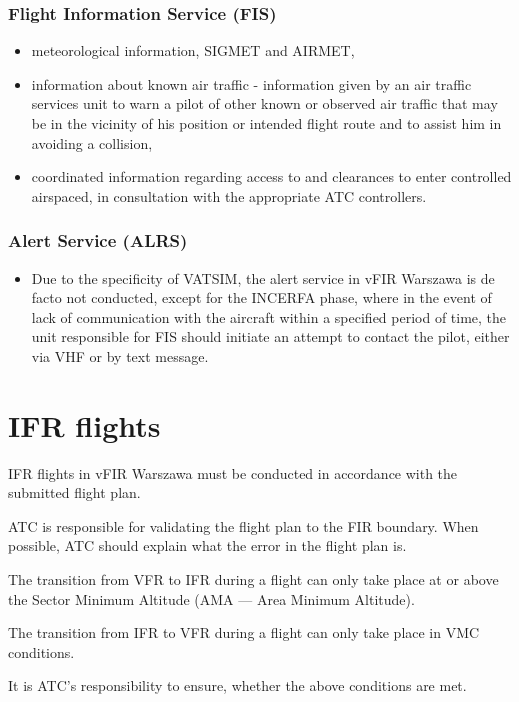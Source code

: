 \subsubsection{Flight Information Service (FIS)}
\begin{itemize}
    \item meteorological information, SIGMET and AIRMET,
    \item information about known air traffic - information given by an air traffic services unit to warn a pilot of other known or observed air traffic that may be in the vicinity of his position or intended flight route and to assist him in avoiding a collision,
    \item coordinated information regarding access to and clearances to enter controlled airspaced, in consultation with the appropriate ATC controllers.
\end{itemize}

\subsubsection{Alert Service (ALRS)}
\begin{itemize}
    \item Due to the specificity of VATSIM, the alert service in vFIR Warszawa is de facto not conducted, except for the INCERFA phase, where in the event of lack of communication with the aircraft within a specified period of time, the unit responsible for FIS should initiate an attempt to contact the pilot, either via VHF or by text message.
\end{itemize}

\section{IFR flights}%

IFR flights in vFIR Warszawa must be conducted in accordance with the submitted flight plan.

ATC is responsible for validating the flight plan to the FIR boundary. When possible, ATC should explain what the error in the flight plan is.

The transition from VFR to IFR during a flight can only take place at or above the Sector Minimum Altitude (AMA --- Area Minimum Altitude).

The transition from IFR to VFR during a flight can only take place in VMC conditions.

It is ATC's responsibility to ensure, whether the above conditions are met.

